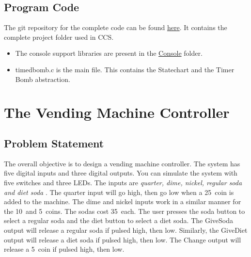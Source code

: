 \documentclass[a4paper,12pt,oneside]{book}
\begin{document}
\subsection{Program Code}
\qquad The git repository for the complete code can be found \href{https://github.com/eYSIP-2017/eYSIP-2017_Game_Development-TI-RTOS/tree/master/TimedBomb_Final}{here}. It contains the complete project folder used in CCS. 
\begin{itemize}
  \item The console support libraries are present in the \href{https://github.com/eYSIP-2017/eYSIP-2017_Game_Development-TI-RTOS/tree/master/TimedBomb_Final/Console}{Console} folder. 
  \item timedbomb.c is the main file. This contains the Statechart and  the Timer Bomb abstraction.
\end{itemize}

\section{The Vending Machine Controller}
\subsection{Problem Statement}
\qquad The overall objective is to design a vending machine controller. The system has five digital inputs and three digital outputs. You can simulate the system with five switches and three LEDs. The inputs are \textit{quarter, dime, nickel, regular soda and diet soda} . The quarter input will go high, then go low when a 25\textcent \  coin is added to the machine. The dime and nickel inputs work in a similar manner for the 10\textcent \  and 5\textcent \ coins. The sodas cost 35\textcent \ each. The user presses the soda button to select a regular soda and the diet button to select a diet soda. The GiveSoda output will release a regular soda if pulsed high, then low. Similarly, the GiveDiet output will release a diet soda if pulsed high, then low. The Change output will release a 5\textcent \ coin if pulsed high, then low.
\end{document}
